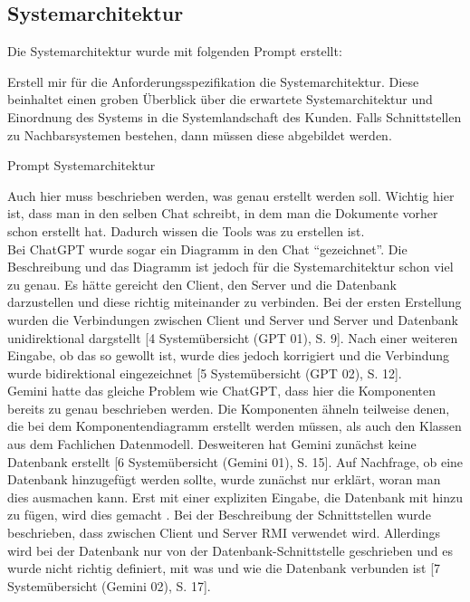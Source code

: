 \subsection*{Systemarchitektur}

Die Systemarchitektur wurde mit folgenden Prompt erstellt:

\begin{prompt}[H]
    \begin{tcolorbox}[colback=gray!20, colframe=gray!20, boxrule=0pt, sharp corners] 
        Erstell mir für die Anforderungsspezifikation die Systemarchitektur. Diese beinhaltet einen groben Überblick über die erwartete Systemarchitektur 
        und Einordnung des Systems in die Systemlandschaft des Kunden. Falls Schnittstellen zu Nachbarsystemen bestehen, dann müssen diese abgebildet werden.
        \vfill
    \end{tcolorbox}
    \caption{Prompt Systemarchitektur}
    \label{Prompt Systemarchitektur}
\end{prompt}

Auch hier muss beschrieben werden, was genau erstellt werden soll. Wichtig hier ist, dass man in den selben Chat schreibt, in dem man die Dokumente vorher
schon erstellt hat. Dadurch wissen die Tools was zu erstellen ist.\\

Bei ChatGPT wurde sogar ein Diagramm in den Chat ``gezeichnet''. Die Beschreibung und das Diagramm ist jedoch für die Systemarchitektur schon viel zu genau.
Es hätte gereicht den Client, den Server und die Datenbank darzustellen und diese richtig miteinander zu verbinden. Bei der ersten Erstellung wurden 
die Verbindungen zwischen Client und Server und Server und Datenbank unidirektional dargstellt [4 Systemübersicht (GPT 01), S. 9]. Nach einer weiteren Eingabe, ob das so gewollt ist, wurde 
dies jedoch korrigiert und die Verbindung wurde bidirektional eingezeichnet [5 Systemübersicht (GPT 02), S. 12].\\

Gemini hatte das gleiche Problem wie ChatGPT, dass hier die Komponenten bereits zu genau beschrieben werden. Die Komponenten ähneln teilweise denen, die bei 
dem Komponentendiagramm erstellt werden müssen, als auch den Klassen aus dem Fachlichen Datenmodell. Desweiteren hat Gemini zunächst keine 
Datenbank erstellt [6 Systemübersicht (Gemini 01), S. 15]. Auf Nachfrage, ob eine Datenbank hinzugefügt werden sollte, wurde zunächst nur erklärt, woran man dies ausmachen kann. 
Erst mit einer expliziten Eingabe, die Datenbank mit hinzu zu fügen, wird dies gemacht . Bei der Beschreibung der Schnittstellen wurde beschrieben, 
dass zwischen Client und Server RMI verwendet wird. Allerdings wird bei der Datenbank nur von der Datenbank-Schnittstelle geschrieben und es wurde 
nicht richtig definiert, mit was und wie die Datenbank verbunden ist [7 Systemübersicht (Gemini 02), S. 17].\\

